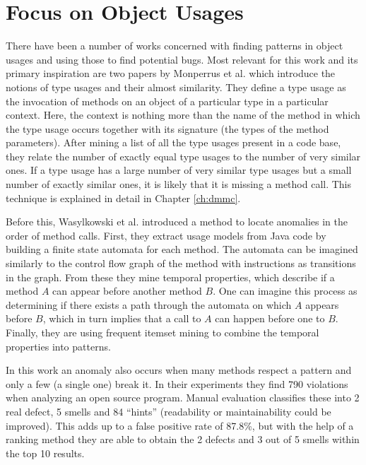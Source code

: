 \section{Focus on Object Usages}

There have been a number of works concerned with finding patterns in object usages and using those to find potential bugs.
Most relevant for this work and its primary inspiration are two papers by Monperrus et al.\cite{monperrus2010detecting}\cite{monperrus2013detecting} which introduce the notions of type usages and their almost similarity.
They define a type usage as the invocation of methods on an object of a particular type in a particular context.
Here, the context is nothing more than the name of the method in which the type usage occurs together with its signature (the types of the method parameters).
After mining a list of all the type usages present in a code base, they relate the number of exactly equal type usages to the number of very similar ones.
If a type usage has a large number of very similar type usages but a small number of exactly similar ones, it is likely that it is missing a method call.
This technique is explained in detail in Chapter \ref{ch:dmmc}.


Before this, Wasylkowski et al. \cite{wasylkowski2007detecting} introduced a method to locate anomalies in the order of method calls.
First, they extract usage models from Java code by building a finite state automata for each method.
The automata can be imagined similarly to the control flow graph of the method with instructions as transitions in the graph.
From these they mine temporal properties, which describe if a method $A$ can appear before another method $B$.
One can imagine this process as determining if there exists a path through the automata on which $A$ appears before $B$, which in turn implies that a call to $A$ can happen before one to $B$.
Finally, they are using frequent itemset mining \cite{han2006data} to combine the temporal properties into patterns.

In this work an anomaly also occurs when many methods respect a pattern and only a few (a single one) break it.
In their experiments they find 790 violations when analyzing an open source program.
Manual evaluation classifies these into 2 real defect, 5 smells and 84 ``hints'' (readability or maintainability could be improved).
This adds up to a false positive rate of 87.8\%, but with the help of a ranking method they are able to obtain the 2 defects and 3 out of 5 smells within the top 10 results.

